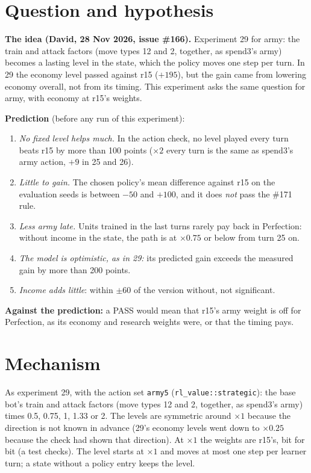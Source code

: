 \documentclass{../polyexp}
\begin{document}

\ExpHeader

\section{Question and hypothesis}
\textbf{The idea (David, 28 Nov 2026, issue \#166).} Experiment 29 for army: the train and attack factors (move types 12 and 2, together, as spend3's army) becomes a lasting
level in the state, which the policy moves one step per turn. In 29 the economy level passed against r15 ($+195$),
but the gain came from lowering economy overall, not from its timing. This experiment asks the same question for
army, with economy at r15's weights.

\textbf{Prediction} (before any run of this experiment):
\begin{enumerate}
  \item \emph{No fixed level helps much.} In the action check, no level played every turn beats r15 by more than 100
        points ($\times2$ every turn is the same as spend3's army action, $+9$ in 25 and 26).
  \item \emph{Little to gain.} The chosen policy's mean difference against r15 on the evaluation seeds is between
        $-50$ and $+100$, and it does \emph{not} pass the \#171 rule.
  \item \emph{Less army late.} Units trained in the last turns rarely pay back in Perfection: without income in the
        state, the path is at $\times0.75$ or below from turn 25 on.
  \item \emph{The model is optimistic, as in 29:} its predicted gain exceeds the measured gain by more than 200
        points.
  \item \emph{Income adds little}: within $\pm 60$ of the version without, not significant.
\end{enumerate}
\textbf{Against the prediction:} a PASS would mean that r15's army weight is off for Perfection, as its economy and
research weights were, or that the timing pays.

\section{Mechanism}
As experiment 29, with the action set \texttt{army5} (\texttt{rl\_value::strategic}): the base bot's train and attack factors (move types 12 and 2, together, as spend3's army)
times 0.5, 0.75, 1, 1.33 or 2. The levels are symmetric around $\times1$ because the direction is not known in
advance (29's economy levels went down to $\times0.25$ because the check had shown that direction). At $\times1$ the
weights are r15's, bit for bit (a test checks). The level starts at $\times1$ and moves at most one step per learner
turn; a state without a policy entry keeps the level.
\end{document}
